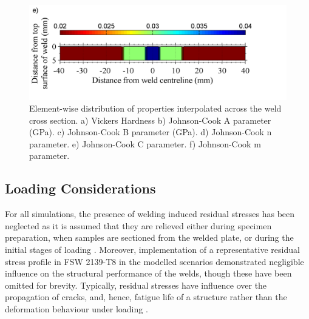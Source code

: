 \begin{figure}
	\includegraphics[width=1\linewidth]{JCCaltered}
	\caption[Mesh]{Element-wise distribution of properties interpolated across the weld cross section. a) Vickers Hardness b) Johnson-Cook A parameter (GPa). c) Johnson-Cook B parameter (GPa). d) Johnson-Cook n parameter. e) Johnson-Cook C parameter. f) Johnson-Cook m parameter.}
	\label{fig:colormaps}
\end{figure} 

\subsection{Loading Considerations}
\label{FELoadingConsiderations}
For all simulations, the presence of welding induced residual stresses has been neglected as it is assumed that they are relieved either during specimen preparation, when samples are sectioned from the welded plate, or during the initial stages of loading \cite{Peel2003}. Moreover, implementation of a representative residual stress profile in FSW 2139-T8 \cite{Grujicic2011a} in the modelled scenarios demonstrated negligible influence on the structural performance of the welds, though these have been omitted for brevity. Typically, residual stresses have influence over the propagation of cracks, and, hence, fatigue life of a structure rather than the deformation behaviour under loading \cite{Jata2000}. 
